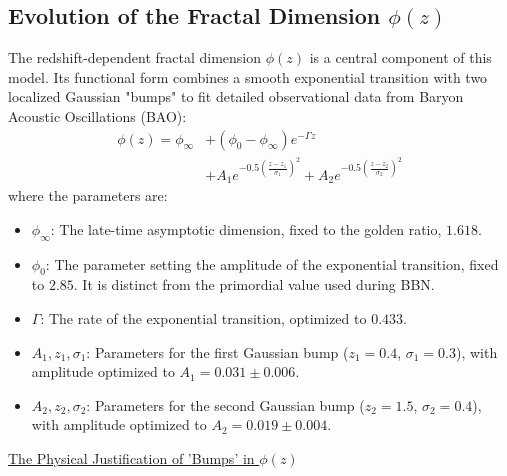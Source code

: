 \documentclass[aps,prl,twocolumn,groupedaddress]{revtex4-2}
\newcommand{\optPhiInf}{1.618}
\newcommand{\phiZeroVal}{2.85}       %
\newcommand{\optGammaVal}{0.433}
\newcommand{\ampGaussOne}{0.031}
\newcommand{\ampGaussTwo}{0.019}
\newcommand{\sigmaGaussOne}{0.3}
\newcommand{\sigmaGaussTwo}{0.4}
\newcommand{\zGaussOne}{0.4}
\newcommand{\zGaussTwo}{1.5}
\begin{document}
\subsection{Evolution of the Fractal Dimension $\phi(z)$}
The redshift-dependent fractal dimension $\phi(z)$ is a central component of this model. Its functional form combines a smooth exponential transition with two localized Gaussian "bumps" to fit detailed observational data from Baryon Acoustic Oscillations (BAO):
\begin{equation}
\begin{split}
\phi(z) = \phi_{\infty} &+ (\phi_0 - \phi_{\infty}) e^{-\Gamma z} \\
&+ A_1 e^{-0.5\left(\frac{z - z_1}{\sigma_1}\right)^2} + A_2 e^{-0.5\left(\frac{z - z_2}{\sigma_2}\right)^2}
\end{split}
\label{eq:phi_z_full}
\end{equation}
where the parameters are:
\begin{itemize}
    \item $\phi_{\infty}$: The late-time asymptotic dimension, fixed to the golden ratio, $\optPhiInf$.
    \item $\phi_0$: The parameter setting the amplitude of the exponential transition, fixed to $\phiZeroVal$. It is distinct from the primordial value used during BBN.
    \item $\Gamma$: The rate of the exponential transition, optimized to $\optGammaVal$.
    \item $A_1, z_1, \sigma_1$: Parameters for the first Gaussian bump ($z_1=\zGaussOne$, $\sigma_1=\sigmaGaussOne$), with amplitude optimized to $A_1 = \ampGaussOne \pm 0.006$.
    \item $A_2, z_2, \sigma_2$: Parameters for the second Gaussian bump ($z_2=\zGaussTwo$, $\sigma_2=\sigmaGaussTwo$), with amplitude optimized to $A_2 = \ampGaussTwo \pm 0.004$.
\end{itemize}

\href{https://phi-z.space/methods/physical_justification_phi_z_bumps.pdf}{The Physical Justification of 'Bumps' in $\phi(z)$}
\end{document}
